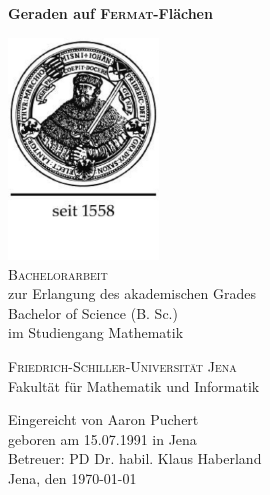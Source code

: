 \begin{titlepage}
\begin{center}

\huge
\textbf{Geraden auf \textsc{Fermat}-Flächen}\\ \vspace{0.8cm}

\includegraphics[width=4cm]{logo.pdf} \\

\textsc{Bachelorarbeit} \\ \vspace{0.8cm}
\large
zur Erlangung des akademischen Grades\\ \vspace{0.3cm}
Bachelor of Science (B. Sc.) \\ \vspace{0.3cm}
im Studiengang Mathematik \\ \vspace{0.8cm}

\textsc{Friedrich-Schiller-Universität Jena}\\ \vspace{0.3cm}
Fakultät für Mathematik und Informatik\\ \vspace{0.8cm}

Eingereicht von Aaron Puchert \\ \vspace{0.3cm}
geboren am 15.07.1991 in Jena \\ \vspace{0.3cm}
Betreuer: PD Dr. habil. Klaus Haberland \\ \vspace{0.6cm}
Jena, den \today

\end{center}
\end{titlepage}
